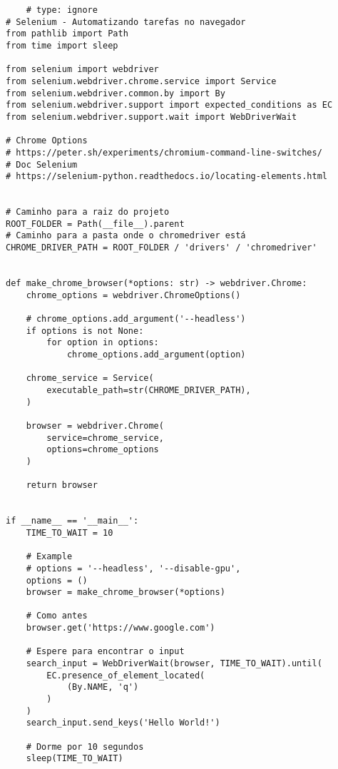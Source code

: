\documentclass{article}
\begin{document}
\begin{lstlisting}
    # type: ignore
# Selenium - Automatizando tarefas no navegador
from pathlib import Path
from time import sleep

from selenium import webdriver
from selenium.webdriver.chrome.service import Service
from selenium.webdriver.common.by import By
from selenium.webdriver.support import expected_conditions as EC
from selenium.webdriver.support.wait import WebDriverWait

# Chrome Options
# https://peter.sh/experiments/chromium-command-line-switches/
# Doc Selenium
# https://selenium-python.readthedocs.io/locating-elements.html


# Caminho para a raiz do projeto
ROOT_FOLDER = Path(__file__).parent
# Caminho para a pasta onde o chromedriver está
CHROME_DRIVER_PATH = ROOT_FOLDER / 'drivers' / 'chromedriver'


def make_chrome_browser(*options: str) -> webdriver.Chrome:
    chrome_options = webdriver.ChromeOptions()

    # chrome_options.add_argument('--headless')
    if options is not None:
        for option in options:
            chrome_options.add_argument(option)

    chrome_service = Service(
        executable_path=str(CHROME_DRIVER_PATH),
    )

    browser = webdriver.Chrome(
        service=chrome_service,
        options=chrome_options
    )

    return browser


if __name__ == '__main__':
    TIME_TO_WAIT = 10

    # Example
    # options = '--headless', '--disable-gpu',
    options = ()
    browser = make_chrome_browser(*options)

    # Como antes
    browser.get('https://www.google.com')

    # Espere para encontrar o input
    search_input = WebDriverWait(browser, TIME_TO_WAIT).until(
        EC.presence_of_element_located(
            (By.NAME, 'q')
        )
    )
    search_input.send_keys('Hello World!')

    # Dorme por 10 segundos
    sleep(TIME_TO_WAIT)
\end{lstlisting}
\end{document}
